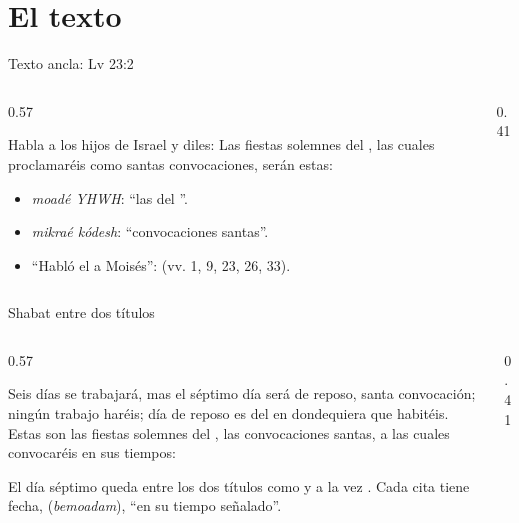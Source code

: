 \section{El texto}

\begin{frame}{Texto ancla: Lv 23:2}
\begin{columns}[c,onlytextwidth]
\begin{column}{0.57\textwidth}
\begin{cita}Habla a los hijos de Israel y diles: Las fiestas solemnes del \SENOR, las cuales proclamaréis como santas convocaciones, serán estas:\end{cita}
\small
\begin{itemize}
\item {} \emph{moadé YHWH}: ``las  del \SENOR''.
\item {} \emph{mikraé kódesh}: ``convocaciones santas''.
\item ``Habló el \SENOR{} a Moisés'':  (vv. 1, 9, 23, 26, 33).
\end{itemize}
\end{column}
\begin{column}{0.41\textwidth}\end{column}
\end{columns}
\end{frame}

\begin{frame}{Shabat entre dos títulos}
\begin{columns}[c,onlytextwidth]
\begin{column}{0.57\textwidth}
\begin{cita}Seis días se trabajará, mas el séptimo día será de reposo, santa convocación; ningún trabajo haréis; día de reposo es del \SENOR{} en dondequiera que habitéis. Estas son las fiestas solemnes del \SENOR, las convocaciones santas, a las cuales convocaréis en sus tiempos:\end{cita}
\scriptsize El día séptimo queda entre los dos títulos como  y a la vez . Cada cita tiene fecha,  (\emph{bemoadam}), ``en su tiempo señalado''.
\end{column}
\begin{column}{0.41\textwidth}\end{column}
\end{columns}
\end{frame}

